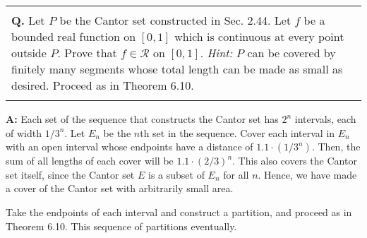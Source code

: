 \documentclass{article}
\newenvironment{myboxed}{\noindent\begin{tabular}{|p{.975\textwidth}|}\hline \\}{\\\\\hline\end{tabular}}
\newcounter{Question}
\newenvironment{Question} 
{\bigskip\begin{myboxed}\refstepcounter{Question}\par\noindent\textbf{Q\theQuestion.}}
{\end{myboxed}\bigskip}
\newenvironment{Answer} {\par\noindent\textbf{A:}} {}
\begin{document}
\begin{Question}
    Let $P$ be the Cantor set constructed in Sec. 2.44. Let $f$ be a bounded real function on $[0, 1]$ which is continuous at every point outside $P$. Prove that $f \in \mathscr{R}$ on $[0,1]$. \textit{Hint:} $P$ can be covered by finitely many segments whose total length can be made as small as desired. Proceed as in Theorem 6.10.
\end{Question}
\begin{Answer}
    Each set of the sequence that constructs the Cantor set has $2^n$ intervals, each of width $1/3^n$. Let $E_n$ be the $n$th set in the sequence. Cover each interval in $E_n$ with an open interval whose endpoints have a distance of $1.1\cdot(1/3^n)$. Then, the sum of all lengths of each cover will be $1.1 \cdot (2/3)^n$. This also covers the Cantor set itself, since the Cantor set $E$ is a subset of $E_n$ for all $n$. Hence, we have made a cover of the Cantor set with arbitrarily small area.

    Take the endpoints of each interval and construct a partition, and proceed as in Theorem 6.10. 
    This sequence of partitions eventually.
\end{Answer}
\end{document}

